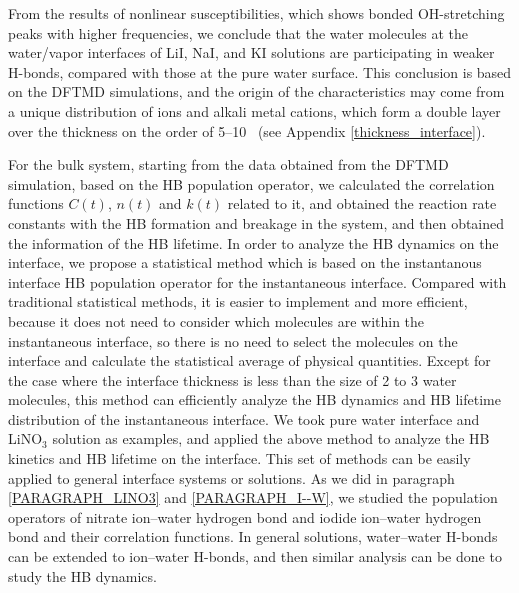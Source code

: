 From the results of nonlinear susceptibilities, which shows bonded OH-stretching peaks with higher frequencies, 
we conclude that the water molecules at the water/vapor interfaces of LiI, NaI, and KI solutions are participating 
in weaker H-bonds, compared with those at the pure water surface. 
This conclusion is based on the DFTMD simulations, and %
the origin of the characteristics may come from a unique distribution of \I ions and alkali metal cations, 
which form a double layer \cite{Shultz2010} over the thickness on the order of 5--10 \A\ (see Appendix \ref{thickness_interface}).

For the bulk system, starting from the data obtained from the DFTMD simulation, based on the HB population operator, 
we calculated the correlation functions $C(t)$, $n(t)$ and $k(t)$ related to it, and obtained the reaction rate constants with the HB formation and breakage in the system, 
and then obtained the information of the HB lifetime. In order to analyze the HB dynamics on the interface, 
we propose a statistical method which is based on the instantanous interface HB population operator for the instantaneous interface.
Compared with traditional statistical methods, it is easier to implement and more efficient, 
because it does not need to consider which molecules are within the instantaneous interface, 
so there is no need to select the molecules on the interface and calculate the statistical average of physical quantities. 
Except for the case where the interface thickness is less than the size of 2 to 3 water molecules, %
this method can efficiently analyze the HB dynamics and HB lifetime distribution of the instantaneous interface.
We took pure water interface and LiNO$_3$ solution as examples, and applied the above method to analyze the HB kinetics and HB lifetime on the interface. 
This set of methods can be easily applied to general interface systems or solutions.
As we did in paragraph \ref{PARAGRAPH_LINO3} and \ref{PARAGRAPH_I--W}, we studied the population operators of nitrate ion--water hydrogen bond 
and iodide ion--water hydrogen bond and their correlation functions. In general solutions, water--water H-bonds can be extended to ion--water H-bonds, 
and then similar analysis can be done to study the HB dynamics.


